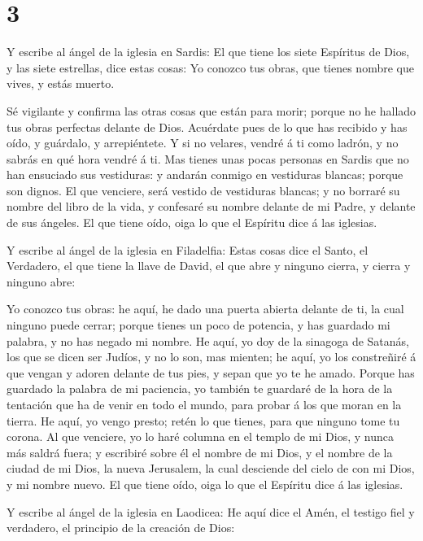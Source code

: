 \hypertarget{section-2}{%
\section{3}\label{section-2}}

 Y escribe al ángel de la iglesia en Sardis: El que tiene
los siete Espíritus de Dios, y las siete estrellas, dice estas cosas: Yo
conozco tus obras, que tienes nombre que vives, y estás muerto.

 Sé vigilante y confirma las otras cosas que están para
morir; porque no he hallado tus obras perfectas delante de Dios.
 Acuérdate pues de lo que has recibido y has oído, y
guárdalo, y arrepiéntete. Y si no velares, vendré á ti como ladrón, y no
sabrás en qué hora vendré á ti.  Mas tienes unas pocas
personas en Sardis que no han ensuciado sus vestiduras: y andarán
conmigo en vestiduras blancas; porque son dignos.  El que
venciere, será vestido de vestiduras blancas; y no borraré su nombre del
libro de la vida, y confesaré su nombre delante de mi Padre, y delante
de sus ángeles.  El que tiene oído, oiga lo que el Espíritu
dice á las iglesias.

 Y escribe al ángel de la iglesia en Filadelfia: Estas cosas
dice el Santo, el Verdadero, el que tiene la llave de David, el que abre
y ninguno cierra, y cierra y ninguno abre:

 Yo conozco tus obras: he aquí, he dado una puerta abierta
delante de ti, la cual ninguno puede cerrar; porque tienes un poco de
potencia, y has guardado mi palabra, y no has negado mi nombre.
 He aquí, yo doy de la sinagoga de Satanás, los que se dicen
ser Judíos, y no lo son, mas mienten; he aquí, yo los constreñiré á que
vengan y adoren delante de tus pies, y sepan que yo te he amado.
 Porque has guardado la palabra de mi paciencia, yo también
te guardaré de la hora de la tentación que ha de venir en todo el mundo,
para probar á los que moran en la tierra.  He aquí, yo
vengo presto; retén lo que tienes, para que ninguno tome tu corona.
 Al que venciere, yo lo haré columna en el templo de mi
Dios, y nunca más saldrá fuera; y escribiré sobre él el nombre de mi
Dios, y el nombre de la ciudad de mi Dios, la nueva Jerusalem, la cual
desciende del cielo de con mi Dios, y mi nombre nuevo.  El
que tiene oído, oiga lo que el Espíritu dice á las iglesias.

 Y escribe al ángel de la iglesia en Laodicea: He aquí dice
el Amén, el testigo fiel y verdadero, el principio de la creación de
Dios:

